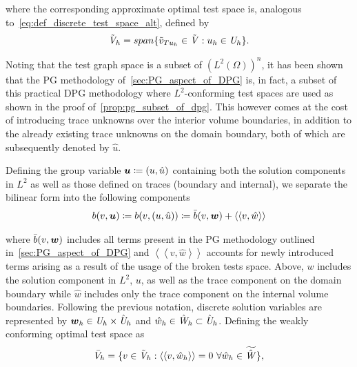 where the corresponding approximate optimal test space is, analogous to~\eqref{eq:def_discrete_test_space_alt}, defined by
\begin{align} \label{eq:def_discrete_test_space_alt_approx}
\tilde{\mathit{{{V}}}}_h = span \{ \tilde{v}_{T u_h} \in \tilde{\mathit{{{V}}}} : u_h \in \mathit{{{U}}}_h \}.
\end{align}


Noting that the test graph space is a subset of $(L^2(\Omega))^n$, it has been shown that the PG methodology
of~\autoref{sec:PG_aspect_of_DPG} is, in fact, a subset of this practical DPG methodology where $L^2$-conforming test
spaces are used as shown in the proof of~\autoref{prop:pg_subset_of_dpg}. This however comes at the cost of introducing
trace unknowns over the interior volume boundaries, in addition to the already existing trace unknowns on the domain
boundary, both of which are subsequently denoted by $\hat{u}$.

Defining the group variable $\mathit{\bm{{u}}} \coloneqq (u,\hat{u})$ containing both the solution components in $L^2$ as well as
those defined on traces (boundary and internal),
we separate the bilinear form into the following components
\begin{align} \label{eq:bilinear_decomposition}
b(v,\mathit{\bm{{u}}})
\coloneqq b(v,(u,\hat{u})) \coloneqq \bar{b}(v,\mathit{\bm{{w}}}) + \left<\left< v,\hat{w} \right>\right>
\end{align}

where $\bar{b}(v,\mathit{\bm{{w}}})$ includes all terms present in the PG methodology outlined in~\autoref{sec:PG_aspect_of_DPG} and
$\left<\left< v,\hat{w} \right>\right>$ accounts for newly introduced terms arising as a result of the usage of the
broken tests space. Above, $w$ includes the solution component in $L^2$, $u$, as well as the trace component on the
domain boundary while $\hat{w}$ includes only the trace component on the internal volume boundaries. Following the
previous notation, discrete solution variables are represented by $\mathit{\bm{{w}}}_h \in \mathit{{{U}}}_h \times \hat{\mathit{{{U}}}}_h$ and
$\hat{w}_h \in \hat{\mathit{{{W}}}}_h \subset \hat{\mathit{{{U}}}}_h$. Defining the weakly
conforming optimal test space as
\begin{align} \label{eq:weakly_conforming_approx_test_space}
\bar{V}_h = \{ v \in \tilde{\mathit{{{V}}}}_h : \left<\left< v,\hat{w}_h \right>\right> = 0\ \forall \hat{w}_h \in \widetilde{\hat{\mathit{{{W}}}}} \},
\end{align}

